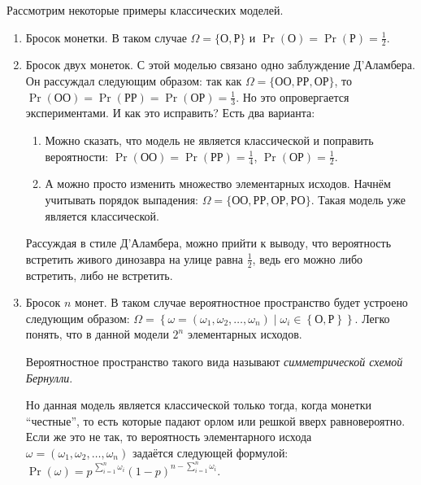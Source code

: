 Рассмотрим некоторые примеры классических моделей.
\begin{enumerate}
    \item Бросок монетки. В таком случае \(\Omega = \{\text{О}, \text{Р}\}\) и \(\Pr(\text{О}) = \Pr(\text{Р}) = \frac{1}{2}\).
    
    \item Бросок двух монеток. С этой моделью связано одно заблуждение Д'Аламбера. Он рассуждал следующим образом: так как \(\Omega = \{\text{ОО}, \text{РР}, \text{ОР}\}\), то \(\Pr(\text{ОО}) = \Pr(\text{РР}) = \Pr(\text{ОР}) = \frac{1}{3}\). Но это опровергается экспериментами. И как это исправить? Есть два варианта:
    \begin{enumerate}
        \item Можно сказать, что модель не является классической и поправить вероятности: \(\Pr(\text{ОО}) = \Pr(\text{РР}) = \frac{1}{4}\), \(\Pr(\text{ОР}) = \frac{1}{2}\).
        \item А можно просто изменить множество элементарных исходов. Начнём учитывать порядок выпадения: \(\Omega = \{\text{ОО}, \text{РР}, \text{ОР}, \text{РО}\}\). Такая модель уже является классической.
    \end{enumerate}
    Рассуждая в стиле Д'Аламбера, можно прийти к выводу, что вероятность встретить живого динозавра на улице равна \(\frac{1}{2}\), ведь его можно либо встретить, либо не встретить.
    
    \item Бросок \(n\) монет. В таком случае вероятностное пространство будет устроено следующим образом:
    \(\Omega = \left\{\omega = (\omega_1, \omega_2, \ldots, \omega_n) \mid \omega_i \in \left\{\text{О}, \text{Р}\right\}\right\}\). Легко понять, что в данной модели \(2^n\) элементарных исходов.
    \begin{remark}
        Вероятностное пространство такого вида называют \emph{симметрической схемой Бернулли}.
    \end{remark}
    Но данная модель является классической только тогда, когда монетки ``честные'', то есть которые падают орлом или решкой вверх равновероятно. Если же это не так, то вероятность элементарного исхода \(\omega = (\omega_1, \omega_2, \ldots, \omega_n)\) задаётся следующей формулой: \(\Pr(\omega) = p^{\,\sum\limits_{i = 1}^{n} \omega_i}(1 - p)^{n - \sum\limits_{i = 1}^{n} \omega_i}\).
    

\end{enumerate}
